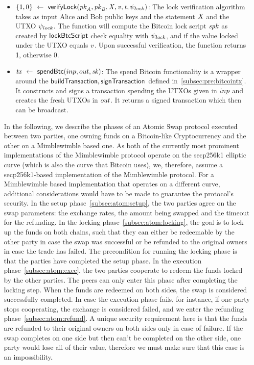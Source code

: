 \begin{itemize}
    \item $\{ 1,0 \} ~\leftarrow~ \mathsf{verifyLock} (\mathit{pk}_{\mathit{A}},\mathit{pk}_{\mathit{B}},\mathit{X},\mathit{v},\mathit{t},\psi_{lock})$:
    The lock verification algorithm takes as input Alice and Bob public keys and the statement $\mathit{X}$ and the UTXO $\psi_{lock}$.
    The function will compute the Bitcoin lock script $\mathit{spk}$ as created by $\mathsf{lockBtcScript}$ check equality with $\psi_{lock}$, and if the value locked under the UTXO equals $\mathit{v}$.
    Upon successful verification, the function returns 1, otherwise 0.
    \item $\mathit{tx} ~\leftarrow~ \mathsf{spendBtc}(inp,out,\mathit{sk})$:
    The spend Bitcoin functionality is a wrapper around the $\mathsf{buildTransaction}, \mathsf{signTransaction}$ defined in~\cref{subsec:pre:bitcointx}.
    It constructs and signs a transaction spending the UTXOs given in $inp$ and creates the fresh UTXOs in $out$.
    It returns a signed transaction which then can be broadcast.
\end{itemize}


In the following, we describe the phases of an Atomic Swap protocol executed between two parties, one owning funds on a Bitcoin-like Cryptocurrency and the other on a Mimblewimble based one.
As both of the currently most prominent implementations of the Mimblewimble protocol operate on the secp256k1 elliptic curve (which is also the curve that Bitcoin uses), we, therefore, assume a secp256k1-based implementation of the Mimblewimble protocol.
For a Mimblewimble based implementation that operates on a different curve, additional considerations would have to be made to guarantee the protocol's security.
In the setup phase~\cref{subsec:atom:setup}, the two parties agree on the swap parameters: the exchange rates, the amount being swapped and the timeout for the refunding.
In the locking phase~\cref{subsec:atom:locking}, the goal is to lock up the funds on both chains, such that they can either be redeemable by the other party in case the swap was successful or be refunded to the original owners in case the trade has failed.
The precondition for running the locking phase is that the parties have completed the setup phase.
In the execution phase~\cref{subsec:atom:exec}, the two parties cooperate to redeem the funds locked by the other parties.
The peers can only enter this phase after completing the locking step.
When the funds are redeemed on both sides, the swap is considered successfully completed.
In case the execution phase fails, for instance, if one party stops cooperating, the exchange is considered failed, and we enter the refunding phase~\cref{subsec:atom:refund}.
A unique security requirement here is that the funds are refunded to their original owners on both sides only in case of failure.
If the swap completes on one side but then can't be completed on the other side, one party would lose all of their value, therefore we must make sure that this case is an impossibility.

